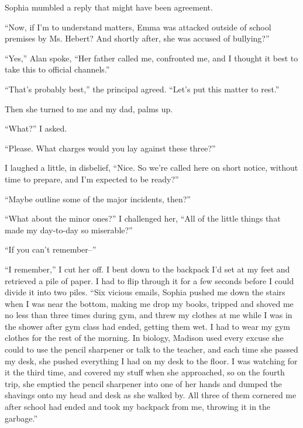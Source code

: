 Sophia mumbled a reply that might have been agreement.



``Now, if I'm to understand matters, Emma was attacked outside of school premises by Ms. Hebert?  And shortly after, she was accused of bullying?''



``Yes,'' Alan spoke, ``Her father called me, confronted me, and I thought it best to take this to official channels.''



``That's probably best,'' the principal agreed.  ``Let's put this matter to rest.''



Then she turned to me and my dad, palms up.



``What?'' I asked.



``Please.  What charges would you lay against these three?''



I laughed a little, in disbelief, ``Nice.  So we're called here on short notice, without time to prepare, and I'm expected to be ready?''



``Maybe outline some of the major incidents, then?''



``What about the minor ones?'' I challenged her, ``All of the little things that made my day-to-day so miserable?''



``If you can't remember--''



``I remember,'' I cut her off.  I bent down to the backpack I'd set at my feet and retrieved a pile of paper.  I had to flip through it for a few seconds before I could divide it into two piles.  ``Six vicious emails, Sophia pushed me down the stairs when I was near the bottom, making me drop my books, tripped and shoved me no less than three times during gym, and threw my clothes at me while I was in the shower after gym class had ended, getting them wet.  I had to wear my gym clothes for the rest of the morning.  In biology, Madison used every excuse she could to use the pencil sharpener or talk to the teacher, and each time she passed my desk, she pushed everything I had on my desk to the floor.  I was watching for it the third time, and covered my stuff when she approached, so on the fourth trip, she emptied the pencil sharpener into one of her hands and dumped the shavings onto my head and desk as she walked by.  All three of them cornered me after school had ended and took my backpack from me, throwing it in the garbage.''



